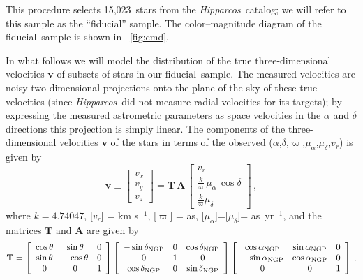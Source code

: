 \documentclass[12pt,preprint]{aastex}
\newcommand{\Hipparcos}{\textsl{Hipparcos}}
\renewcommand{\vec}[1]{\mathbf{#1}} %
\newcommand{\vv}{\vec{v}}
\newcommand{\ten}[1]{\mathbf{#1}} %
\newcommand{\TT}{\ten{T}}
\newcommand{\AAA}{\ten{A}}
\newcommand{\ra}{\ensuremath{\alpha}}
\newcommand{\dec}{\ensuremath{\delta}}
\newcommand{\pmra}{\ensuremath{\mu_{\ra}}}
\newcommand{\pmdec}{\ensuremath{\mu_{\dec}}}
\newcommand{\parallax}{\ensuremath{\varpi}}
\newcommand{\vrr}{\ensuremath{v_r}}
\newcommand{\ngp}{\textnormal{NGP}}
\newcommand{\rangp}{\ensuremath{\ra_\ngp}}
\newcommand{\decngp}{\ensuremath{\dec_\ngp}}
\newcommand{\matrixleft}{\left[}
\newcommand{\matrixright}{\right]}
\newcommand{\arcsecs}{\textnormal{as}}
\newcommand{\vx}{\ensuremath{v_x}}
\newcommand{\vy}{\ensuremath{v_y}}
\newcommand{\vz}{\ensuremath{v_z}}
\newcommand{\nstars}{15,023}
\newcommand{\fiducial}{fiducial}
\begin{document}
This procedure selects \nstars\ stars from the \Hipparcos\
catalog; we will refer to this sample as the ``\fiducial'' sample. The
color--magnitude diagram of the \fiducial\ sample is shown in
\figurename~\ref{fig:cmd}.

In what follows we will model the distribution of the true
three-dimensional velocities $\vv$ of subsets of stars in our
\fiducial\ sample. The measured velocities are noisy two-dimensional
projections onto the plane of the sky of these true velocities (since
\Hipparcos\ did not measure radial velocities for its targets); by
expressing the measured astrometric parameters as space velocities in
the $\ra$ and $\dec$ directions this projection is simply linear. The
components of the three-dimensional velocities $\vv$ of the stars in
terms of the observed (\ra,\dec,\parallax,\pmra,\pmdec,\vrr) is given
by
\begin{equation}\label{eq:vrpmrapmdectoUVW2}
\vv \equiv \matrixleft \begin{array}{c} \vx \\ \vy \\ \vz \end{array}
\matrixright = \TT \, \AAA \, \matrixleft \begin{array}{c} \vrr \\
\frac{k}{\parallax}\,\pmra\,\cos\dec\\\frac{k}{\parallax}\pmdec\end{array}
\matrixright\, ,
\end{equation}
where $k = 4.74047$, [\vrr] = km s$^{-1}$, [\parallax] = \arcsecs,
[\pmra]=[\pmdec]= \arcsecs\ yr$^{-1}$, and the matrices $\TT$ and
$\AAA$ are given by
\begin{equation}\label{eq:radectolbT}
\TT = \matrixleft \begin{array}{ccc} \cos \theta & \sin \theta &
0\\\sin \theta & -\cos \theta & 0\\0&0&1 \end{array} \matrixright
\matrixleft \begin{array}{ccc} -\sin \decngp & 0 & \cos \decngp\\ 0 &
1 & 0 \\ \cos \decngp & 0 & \sin \decngp\end{array} \matrixright
\matrixleft \begin{array}{ccc} \cos \rangp &\sin\rangp&0\\ -\sin\rangp
& \cos\rangp&0\\ 0&0&1\end{array} \matrixright\, ,
\end{equation}
\end{document}
